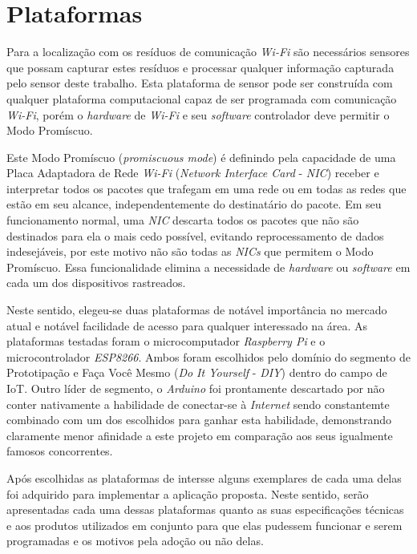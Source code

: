 \chapter{Plataformas}
\label{chap:Plataformas}

Para a localização com os resíduos de comunicação \emph{Wi-Fi} são necessários
sensores que possam capturar estes resíduos e processar qualquer informação
capturada pelo sensor deste trabalho. Esta plataforma de sensor pode ser construída com
qualquer plataforma computacional capaz de ser programada com comunicação
\emph{Wi-Fi}, porém o \emph{hardware} de \emph{Wi-Fi} e seu \emph{software}
controlador deve permitir o Modo Promíscuo.

Este Modo Promíscuo (\emph{promiscuous mode}) é definindo pela capacidade de uma
Placa Adaptadora de Rede \emph{Wi-Fi} (\emph{Network Interface Card} -
\emph{NIC}) receber e interpretar todos os pacotes que trafegam em uma rede ou
em todas as redes que estão em seu alcance, independentemente do destinatário do
pacote. Em seu funcionamento normal, uma \emph{NIC} descarta todos os pacotes que
não são destinados para ela o mais cedo possível, evitando reprocessamento de
dados indesejáveis, por este motivo não são todas as \emph{NICs} que permitem o
Modo Promíscuo. Essa funcionalidade elimina a necessidade de \emph{hardware} ou
\emph{software} em cada um dos dispositivos rastreados.

Neste sentido, elegeu-se duas plataformas de notável importância no mercado atual
e notável facilidade de acesso para qualquer interessado na área. As plataformas
testadas foram o microcomputador \emph{Raspberry Pi} e o microcontrolador
\emph{ESP8266}. Ambos  foram escolhidos pelo domínio do segmento de Prototipação
e Faça Você Mesmo  (\emph{Do It Yourself} - \emph{DIY}) dentro do campo de IoT.
Outro líder de segmento, o \emph{Arduino}  foi prontamente descartado por não
conter nativamente a habilidade de conectar-se à \emph{Internet} sendo
constantemte combinado com um dos escolhidos para ganhar esta habilidade,
demonstrando claramente menor afinidade a este projeto em comparação aos seus
igualmente famosos concorrentes.

Após escolhidas as plataformas de intersse alguns exemplares de cada uma delas
foi adquirido para implementar a aplicação proposta. Neste sentido, serão
apresentadas cada uma dessas plataformas quanto as suas especificações técnicas
e aos produtos utilizados em conjunto para que elas pudessem funcionar e serem
programadas e os motivos pela adoção ou não delas.
